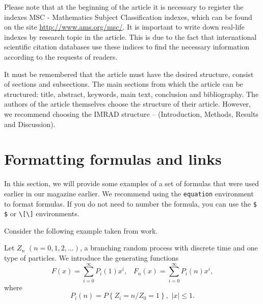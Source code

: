 \documentclass{mfitjournal-en}%
\begin{document}
Please note that at the beginning of the article it is necessary to register the indexes MSC - Mathematics Subject Classification indexes, which can be found on the site \href{http://www.ams.org/msc/} {http://www.ams.org/msc/}. It is important to write down real-life indexes by research topic in the article. This is due to the fact that international scientific citation databases use these indices to find the necessary information according to the requests of readers.


It must be remembered that the article must have the desired structure, consist of sections and subsections. The main sections from which the article can be structured: title, abstract, keywords, main text, conclusion and bibliography. The authors of the article themselves choose the structure of their article. However, we recommend choosing the IMRAD structure -- (Introduction, Methods, Results and Discussion).

\section*{Formatting formulas and links}


In this section, we will provide some examples of a set of formulas that were used earlier in our magazine earlier. We recommend using the {\tt equation} environment to format formulas. If you do not need to number the formula, you can use the \verb "$ $" or \verb "\[\]" environments.

Consider the following example taken from work\cite{Jur20}.

Let $ Z_{n} \, \, \left(n = 0,1,2, \ldots \right) $, a branching random process with discrete time and one type of particles. We introduce the generating functions
\[
F(x)=\sum _{i=0}^{\infty }P_{i} (1)x^{i}  ,\, \, \, \, \, F_{n} (x)=\sum _{i=0}^{\infty }P_{i} (n)x^{i},
\] 
where
\[
P_{i} (n)=P\left\{Z_{i} =n/Z_{0} =1\right\},\, \, \left|x\right|\le 1.
\] 
\end{document}

